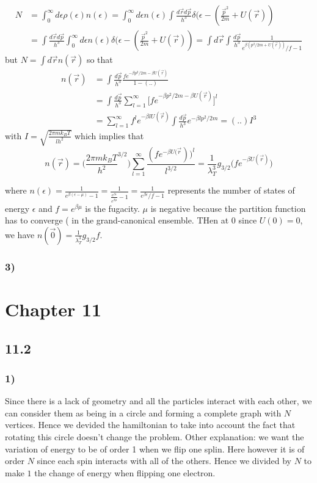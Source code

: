 \documentclass[10pt,a4paper]{book}
\begin{document}
\begin{align*}
N&=\int_{0}^{\infty}d\epsilon \rho(\epsilon)n(\epsilon)=\int_0^{\infty} d\epsilon n(\epsilon) \int\frac{d\vec{r}d\vec{p}}{h^3}\delta(\epsilon-(\frac{\vec{p}^2}{2m}+U(\vec{r}))\\
&=\int\frac{d\vec{r}d\vec{p}}{h^3}\int_0^{\infty}d\epsilon n(\epsilon)\delta(\epsilon-(\frac{\vec{p}^2}{2m}+U(\vec{r}))=\int d\vec{r}\int\frac{d\vec{p}}{h^3} \frac{1}{e^{\beta(p^2/2m+U(\vec{r}))}/f-1}
\end{align*}
but $N=\int d\vec{r}n(\vec{r})$ so that
\begin{align*}
n(\vec{r})&=\int\frac{d\vec{p}}{h^3}\frac{fe^{-\beta p^2/2m-\beta U(\vec{r})}}{1-(..)}\\
&=\int\frac{d\vec{p}}{h^3}\sum_{l=1}^{\infty}\bigg[fe^{-\beta p^2/2m-\beta U(\vec{r})}\bigg]^l\\
&=\sum_{l=1}^{\infty}f^le^{-\beta lU(\vec{r})}\int\frac{d\vec{p}}{h^3}e^{-\beta lp^2/2m}=(..)I^3
\end{align*}
with $I=\sqrt{\frac{2\pi m k_BT}{lh^2}}$ which implies that 
$$n(\vec{r})=\bigg(\frac{2\pi mk_BT}{h^2}^{3/2}\bigg)\sum_{l=1}^{\infty}\frac{(fe^{-\beta U(\vec{r}}))^l}{l^{3/2}}=\frac{1}{\lambda_T^3}g_{3/2}\bigg(fe^{-\beta U(\vec{r})}\bigg)$$



where $n(\epsilon)=\frac{1}{e^{\beta(\epsilon-\mu)}-1}=\frac{1}{\frac{e^{\beta\epsilon}}{e^{\beta\mu}}-1}=\frac{1}{e^{\beta\epsilon}/f-1}$ represents the number of states of energy $\epsilon$ and $f=e^{\beta\mu}$ is the fugacity. $\mu$ is negative because the partition function has to converge ( in the grand-canonical ensemble. 
THen at $0$ since $U(0)=0$, we have $n(\vec{0})=\frac{1}{\lambda_T^3}g_{3/2}f$. 
 
 
\subsection*{3)}





\chapter*{Chapter 11}


\section*{11.2}

\subsection*{1)}
Since there is a lack of geometry and all the particles interact with each other, we can consider them as being in a circle and forming a complete graph with $N$ vertices. Hence we devided the hamiltonian to take into account the fact that rotating this circle doesn't change the problem. Other explanation: we want the variation of energy to be of order 1 when we flip one splin. Here however it is of order $N$ since each spin interacts with all of the others. Hence we divided by $N$ to make $1$ the change of energy when flipping one electron. 
\end{document}
